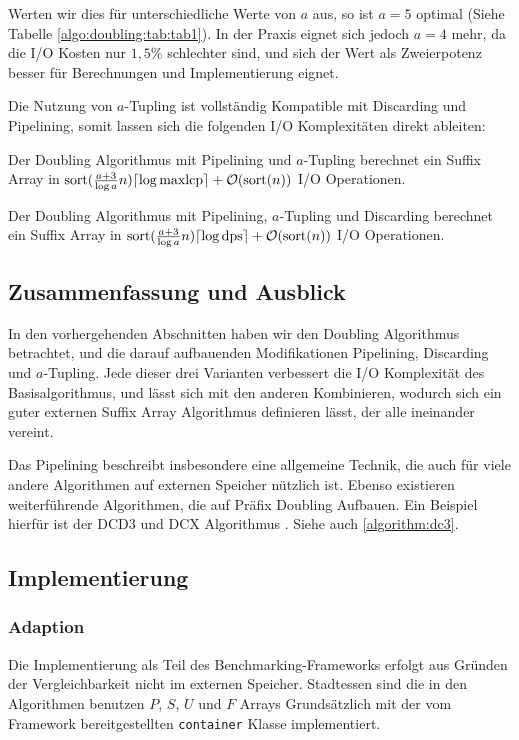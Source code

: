 Werten wir dies für unterschiedliche Werte von $a$ aus, so ist $a = 5$ optimal (Siehe Tabelle \ref{algo:doubling:tab:tab1}). In der Praxis eignet sich jedoch $a = 4$ mehr, da die I/O Kosten nur $1,5\%$ schlechter sind, und sich der Wert als Zweierpotenz besser für Berechnungen und Implementierung eignet.

Die Nutzung von $a$-Tupling ist vollständig Kompatible mit Discarding und Pipelining, somit lassen sich die folgenden I/O Komplexitäten direkt ableiten:

\begin{theorem}
Der Doubling Algorithmus mit Pipelining und $a$-Tupling berechnet ein Suffix Array in $\text{sort}(\frac{a + 3}{\log a}n) \ceil*{\log \text{maxlcp}} +  \mathcal{O}(\text{sort}(n))$ I/O Operationen.
\end{theorem}

\begin{theorem}
Der Doubling Algorithmus mit Pipelining, $a$-Tupling und Discarding berechnet ein Suffix Array in $\text{sort}(\frac{a + 3}{\log a}n) \ceil*{\log \text{dps}} +  \mathcal{O}(\text{sort}(n))$ I/O Operationen.
\end{theorem}

\subsection{Zusammenfassung und Ausblick}
\label{algo:doubling:sec:summary}

In den vorhergehenden Abschnitten haben wir den Doubling Algorithmus betrachtet, und die darauf aufbauenden Modifikationen Pipelining, Discarding und $a$-Tupling. Jede dieser drei Varianten verbessert die I/O Komplexität des Basisalgorithmus, und lässt sich mit den anderen Kombinieren, wodurch sich ein guter externen Suffix Array Algorithmus definieren lässt, der alle ineinander vereint.

Das Pipelining beschreibt insbesondere eine allgemeine Technik, die auch für viele andere Algorithmen auf externen Speicher nützlich ist. Ebenso existieren weiterführende Algorithmen, die auf Präfix Doubling Aufbauen. Ein Beispiel hierfür ist der DCD3 und DCX Algorithmus \cite{saca:11}. Siehe auch \cref{algorithm:dc3}.

\subsection{Implementierung}
\subsubsection{Adaption}
Die Implementierung als Teil des Benchmarking-Frameworks erfolgt aus Gründen der Vergleichbarkeit nicht im externen Speicher. Stadtessen sind die in den Algorithmen benutzen $P$, $S$, $U$ und $F$ Arrays Grundsätzlich mit der vom Framework bereitgestellten \texttt{container} Klasse implementiert.

